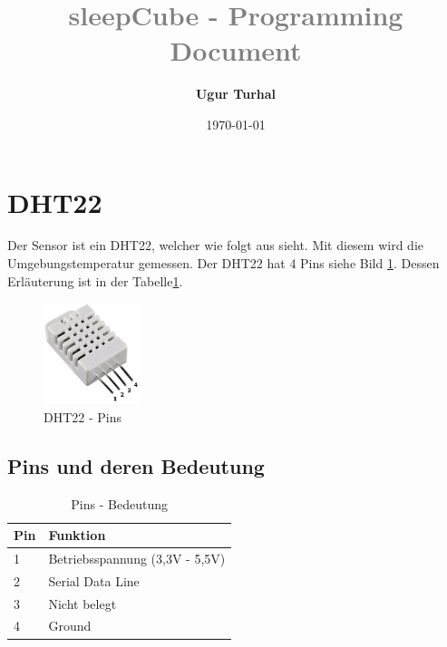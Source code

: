\documentclass[12pt]{article}
\title{\textcolor{gray}{\textbf{sleepCube - Programming Document}\\[0.2cm]}}
\author[1]{\fontsize{9}{9} \textbf{Ugur Turhal}}
\affil[1]{\fontsize{8}{8}\href{mailto:ugur.turhal@me.com}{ugur.turhal@me.com}}
\date{\today}
\begin{document}
\maketitle
\tableofcontents
{}
\newpage
\setcounter{page}{1}
\section{DHT22}
\justifying
Der Sensor ist ein DHT22, welcher wie folgt aus sieht. Mit diesem wird die Umgebungstemperatur gemessen. Der DHT22 hat 4 Pins siehe Bild \ref{Fig:description}. Dessen Erläuterung ist in der Tabelle\ref{Tabular:pins}.
\begin{figure}[H]
\begin{center}
\includegraphics[width = 0.25\textwidth]{pics/DHT22.jpg}
\caption{DHT22 - Pins}
\label{Fig:description}
\end{center}
\end{figure}
\subsection{Pins und deren Bedeutung}
\begin{table}[H]
\centering
{}
\begin{tabular}{l|l}
\textbf{Pin} & \textbf{Funktion}\\ \hline \hline
1 & Betriebsspannung (3,3V - 5,5V) \\ \hline
2 & Serial Data Line\\\hline
3 & Nicht belegt\\ \hline
4 & Ground
\end{tabular}
\caption{Pins - Bedeutung}
\label{Tabular:pins}
\end{table}
\end{document}
